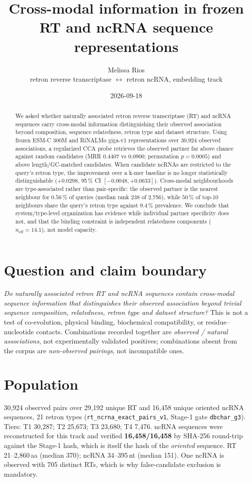 \documentclass[11pt,a4paper]{article}
\title{Cross-modal information in frozen RT and ncRNA sequence representations}
\author{Melissa Rios \\ \small retron reverse transcriptase $\leftrightarrow$ retron ncRNA, embedding track}
\date{2026-09-18}
\begin{document}
\maketitle

\begin{abstract}
We asked whether naturally associated retron reverse transcriptase (RT) and ncRNA sequences
carry cross-modal information distinguishing their observed association beyond composition,
sequence relatedness, retron type and dataset structure. Using frozen ESM-C 300M and RiNALMo
giga-v1 representations over 30{,}924 observed associations, a regularized CCA probe retrieves
the observed partner far above chance against random candidates (MRR $0.4407$ vs $0.0900$;
permutation $p=0.0005$) and above length/GC-matched candidates. When candidate ncRNAs are
restricted to the query's retron type, the improvement over a k-mer baseline is no longer
statistically distinguishable ($+0.0298$, 95\,\% CI $[-0.0048,+0.0633]$). Cross-modal
neighbourhoods are type-associated rather than pair-specific: the observed partner is the nearest
neighbour for $0.56\,\%$ of queries (median rank 238 of 2{,}756), while $50\,\%$ of top-10
neighbours share the query's retron type against $9.4\,\%$ prevalence. We conclude that
system/type-level organization has evidence while individual partner specificity does not, and
that the binding constraint is independent relatedness components ($n_{\mathrm{eff}}=14.1$), not
model capacity.
\end{abstract}

\section{Question and claim boundary}
\emph{Do naturally associated retron RT and ncRNA sequences contain cross-modal sequence
information that distinguishes their observed association beyond trivial sequence composition,
relatedness, retron type and dataset structure?} This is not a test of co-evolution, physical
binding, biochemical compatibility, or residue--nucleotide contacts. Combinations recorded
together are \emph{observed / natural associations}, not experimentally validated positives;
combinations absent from the corpus are \emph{non-observed pairings}, not incompatible ones.

\section{Population}
30{,}924 observed pairs over 29{,}192 unique RT and 16{,}458 unique oriented ncRNA sequences,
21 retron types (\texttt{rt\_ncrna\_exact\_pairs\_v1}, Stage-1 gate \texttt{dbchar\_g3}). Tiers:
T1 30{,}287; T2 25{,}673; T3 23{,}680; T4 7{,}476. ncRNA sequences were reconstructed for this
track and verified \textbf{16{,}458/16{,}458} by SHA-256 round-trip against the Stage-1 hash,
which is itself the hash of the \emph{oriented} sequence. RT 21--2{,}860\,aa (median 370);
ncRNA 34--395\,nt (median 151). One ncRNA is observed with 705 distinct RTs, which is why
false-candidate exclusion is mandatory.
\end{document}
